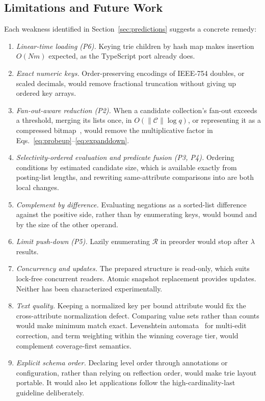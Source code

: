 \subsection{Limitations and Future Work}
\label{sec:future}
Each weakness identified in Section~\ref{sec:predictions} suggests a concrete remedy:
\begin{enumerate}
\item \emph{Linear-time loading (P6).} Keying trie children by hash map makes insertion $O(Nm)$ expected, as the TypeScript port already does.
\item \emph{Exact numeric keys.} Order-preserving encodings of IEEE-754 doubles, or scaled decimals, would remove fractional truncation without giving up ordered key arrays.
\item \emph{Fan-out-aware reduction (P2).} When a candidate collection's fan-out exceeds a threshold, merging its lists once, in $O(\|\mathcal{C}\|\log q)$, or representing it as a compressed bitmap~\cite{lemire2016roaring}, would remove the multiplicative factor in Eqs.~\eqref{eq:probeup}--\eqref{eq:expanddown}.
\item \emph{Selectivity-ordered evaluation and predicate fusion (P3, P4).} Ordering conditions by estimated candidate size, which is available exactly from posting-list lengths, and rewriting same-attribute comparisons into  are both local changes.
\item \emph{Complement by difference.} Evaluating negations as a sorted-list difference against the positive side, rather than by enumerating keys, would bound  and  by the size of the other operand.
\item \emph{Limit push-down (P5).} Lazily enumerating $\mathcal{R}$ in preorder would stop after $\lambda$ results.
\item \emph{Concurrency and updates.} The prepared structure is read-only, which suits lock-free concurrent readers. Atomic snapshot replacement provides updates. Neither has been characterized experimentally.
\item \emph{Text quality.} Keeping a normalized key per bound attribute would fix the cross-attribute normalization defect. Comparing value sets rather than counts would make minimum match exact. Levenshtein automata~\cite{schulz2002fast} for multi-edit correction, and term weighting within the winning coverage tier, would complement coverage-first semantics.
\item \emph{Explicit schema order.} Declaring level order through annotations or configuration, rather than relying on reflection order, would make trie layout portable. It would also let applications follow the high-cardinality-last guideline deliberately.
\end{enumerate}

